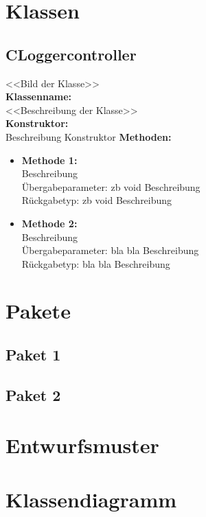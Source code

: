 \section{Klassen}
\subsection{CLoggercontroller}
<<Bild der Klasse>>
\\\textbf{Klassenname:}
\\<<Beschreibung der Klasse>>
\\\textbf{Konstruktor:}
\\Beschreibung Konstruktor
\textbf{Methoden:}
\begin{itemize}
\item \textbf{Methode 1:} 
\\Beschreibung 
\\Übergabeparameter: zb void Beschreibung
\\Rückgabetyp: zb void Beschreibung
\item \textbf{Methode 2:} 
\\Beschreibung 
\\Übergabeparameter: bla bla Beschreibung
\\Rückgabetyp: bla bla Beschreibung
\end{itemize}
\section{Pakete}
\subsection{Paket 1}
\subsection{Paket 2}
\section{Entwurfsmuster}

\section{Klassendiagramm}

